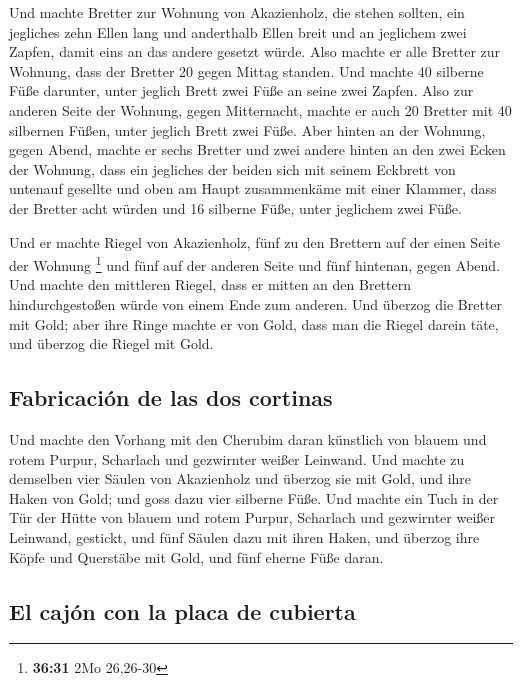  Und machte Bretter zur Wohnung von Akazienholz, die
stehen sollten,  ein jegliches zehn Ellen lang und
anderthalb Ellen breit  und an jeglichem zwei Zapfen,
damit eins an das andere gesetzt würde. Also machte er alle Bretter zur
Wohnung,  dass der Bretter 20 gegen Mittag standen.
 Und machte 40 silberne Füße darunter, unter jeglich
Brett zwei Füße an seine zwei Zapfen.  Also zur anderen
Seite der Wohnung, gegen Mitternacht, machte er auch 20 Bretter
 mit 40 silbernen Füßen, unter jeglich Brett zwei Füße.
 Aber hinten an der Wohnung, gegen Abend, machte er sechs
Bretter  und zwei andere hinten an den zwei Ecken der
Wohnung,  dass ein jegliches der beiden sich mit seinem
Eckbrett von untenauf gesellte und oben am Haupt zusammenkäme mit einer
Klammer,  dass der Bretter acht würden und 16 silberne
Füße, unter jeglichem zwei Füße.

 Und er machte Riegel von Akazienholz, fünf zu den
Brettern auf der einen Seite der Wohnung \footnote{\textbf{36:31} 2Mo
  26,26-30}  und fünf auf der anderen Seite und fünf
hintenan, gegen Abend.  Und machte den mittleren Riegel,
dass er mitten an den Brettern hindurchgestoßen würde von einem Ende zum
anderen.  Und überzog die Bretter mit Gold; aber ihre
Ringe machte er von Gold, dass man die Riegel darein täte, und überzog
die Riegel mit Gold.

\hypertarget{fabricaciuxf3n-de-las-dos-cortinas}{%
\subsection{Fabricación de las dos
cortinas}\label{fabricaciuxf3n-de-las-dos-cortinas}}

 Und machte den Vorhang mit den Cherubim daran künstlich
von blauem und rotem Purpur, Scharlach und gezwirnter weißer Leinwand.
 Und machte zu demselben vier Säulen von Akazienholz und
überzog sie mit Gold, und ihre Haken von Gold; und goss dazu vier
silberne Füße.  Und machte ein Tuch in der Tür der Hütte
von blauem und rotem Purpur, Scharlach und gezwirnter weißer Leinwand,
gestickt,  und fünf Säulen dazu mit ihren Haken, und
überzog ihre Köpfe und Querstäbe mit Gold, und fünf eherne Füße daran.

\hypertarget{el-cajuxf3n-con-la-placa-de-cubierta}{%
\subsection{El cajón con la placa de
cubierta}\label{el-cajuxf3n-con-la-placa-de-cubierta}}

